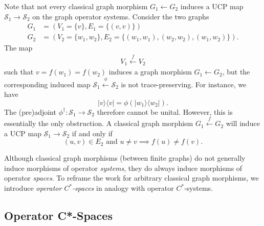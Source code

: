 \documentclass[12pt]{article}
\theoremstyle{definition}
\newenvironment{remark}
  {\pushQED{\qed}\renewcommand{\qedsymbol}{\textcircled{\tiny R}}\remarkx}
  {\popQED\endremarkx}
\newcommand{\mc}[1]{\mathcal{#1}}
\newcommand{\<}{\langle}
\renewcommand{\>}{\rangle}
\begin{document}
\begin{remark} \label{rmk: when is it ucp}
    Note that not every classical graph morphism $G_1 \leftarrow G_2$ induces a UCP map $\mc S_1 \to \mc S_2$ on the graph operator systems. Consider the two graphs 
    \begin{align*} 
    G_1 &= (V_1 = \{v\}, E_1 = \{(v,v)\}) \\
    G_2 &= (V_2 = \{w_1, w_2\}, E_2 = \{(w_1, w_1), (w_2,w_2), (w_1,w_2)\}).
    \end{align*}
    The map
    \begin{align*}
    V_1 \overset{f}{\leftarrow} V_2 
    \end{align*}
    such that $v = f(w_1)= f(w_2)$ induces a graph morphism $G_1 \leftarrow G_2$, but the corresponding induced map $\mc S_1 \overset{\phi}{\leftarrow} \mc S_2$ is not trace-preserving. For instance, we have
    \[
    |v\>\< v| = \phi(|w_1\>\<w_2|).
    \]
    The (pre)adjoint $\phi^\dagger: \mc S_1 \to \mc S_2$ therefore cannot be unital. However, this is essentially the only obstruction. A classical graph morphism $G_1 \overset{f}{\leftarrow} G_2$ will induce a UCP map $\mc S_1 \to \mc S_2$ if and only if 
    \[
    (u,v) \in E_2 \text{ and } u \neq v\implies f(u) \neq f(v).
    \]
\end{remark}

Although classical graph morphisms (between finite graphs) do not generally induce morphisms of operator \textit{systems}, they do always induce morphisms of operator \textit{spaces}. To reframe the \cite{mawtod} work for arbitrary classical graph morphisms, we introduce \textit{operator $C^*$-spaces} in analogy with operator $C^*$-systems. 

\subsection{Operator C*-Spaces} 
\end{document}
